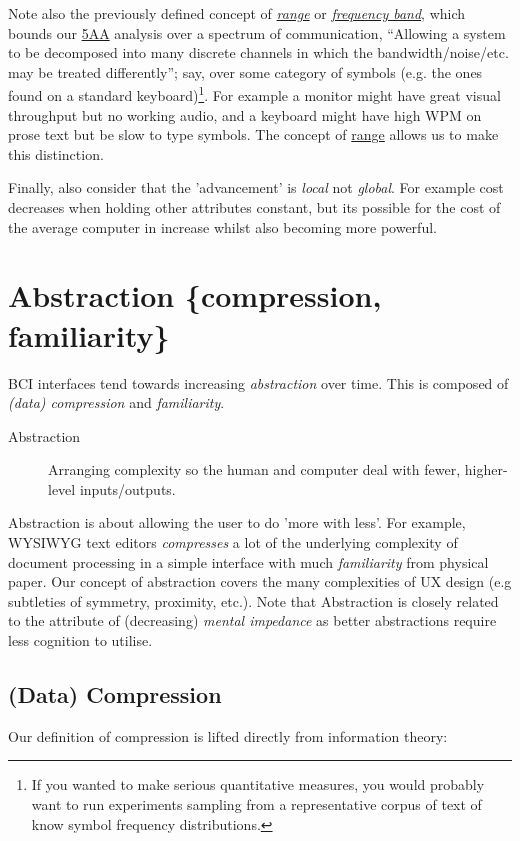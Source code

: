 \documentclass[logo,bsc,singlespacing,parskip]{infthesis}
\begin{document}
Note also the previously defined concept of \emph{\hyperref[range]{range}} or \emph{\hyperref[org9e30e41]{frequency band}}, which bounds our \hyperref[orgce96c46]{5AA} analysis over a spectrum of communication, ``Allowing a system to be decomposed into many discrete channels in which the bandwidth/noise/etc. may be treated differently''; say, over some category of symbols (e.g. the ones found on a standard keyboard)\footnote{If you wanted to make serious quantitative measures, you would probably want to run experiments sampling from a representative corpus of text of know symbol frequency distributions.}.
For example a monitor might have great visual throughput but no working audio, and a keyboard might have high WPM on prose text but be slow to type symbols.
The concept of \hyperref[range]{range} allows us to make this distinction.

Finally, also consider that the 'advancement' is \emph{local} not \emph{global}.
For example cost decreases when holding other attributes constant, but its possible for the cost of the average computer in increase whilst also becoming more powerful.
\section{Abstraction \{compression, familiarity\}}
\label{sec:orgabe97f2}
BCI interfaces tend towards increasing \emph{abstraction} over time.
This is composed of \emph{(data) compression} and \emph{familiarity}.

\begin{mdframed}
\begin{description}
\item[{Abstraction\label{abstraction}}] Arranging complexity so the human and computer deal with fewer, higher-level inputs/outputs.
\end{description}
\end{mdframed}

Abstraction is about allowing the user to do 'more with less'.
For example, WYSIWYG text editors \emph{compresses} a lot of the underlying complexity of document processing in a simple interface with much \emph{familiarity} from physical paper.
Our concept of abstraction covers the many complexities of UX design (e.g subtleties of symmetry, proximity, etc.).
Note that Abstraction is closely related to the attribute of (decreasing) \emph{mental impedance} as better abstractions require less cognition to utilise.
\subsection{(Data) Compression}
\label{sec:org74b93bf}
Our definition of compression is lifted directly from information theory:
\end{document}
